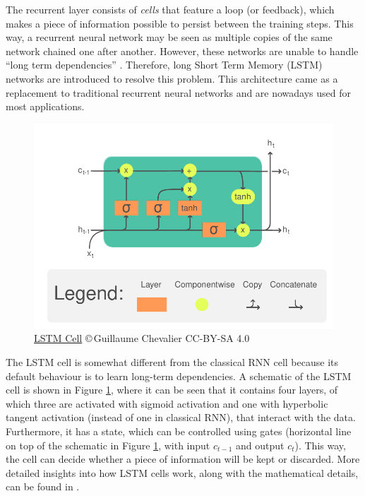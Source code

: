 The recurrent layer consists of \emph{cells} that feature a loop (or feedback), which makes a piece of information possible to persist between the training steps. This way, a recurrent neural network may be seen as multiple copies of the same network chained one after another. However, these networks are unable to handle ``long term dependencies'' \cite{Bengio1994}. Therefore, long Short Term Memory (LSTM) networks are introduced \cite{Hochreiter1997} to resolve this problem. This architecture came as a replacement to traditional recurrent neural networks and are nowadays used for most applications.

\begin{figure}
    \centering
    \includegraphics[width=\textwidth]{slike/LSTM_Cell.pdf}
    \caption[LSTM Cell]{\href{https://commons.wikimedia.org/wiki/File:LSTM_Cell.svg}{LSTM Cell} \copyright\,Guillaume Chevalier CC-BY-SA 4.0}
    \label{fig:LSTMCell}
\end{figure}

The LSTM cell is somewhat different from the classical RNN cell because its default behaviour is to learn long-term dependencies. A schematic of the LSTM cell is shown in Figure \ref{fig:LSTMCell}, where it can be seen that it contains four layers, of which three are activated with sigmoid activation and one with hyperbolic tangent activation (instead of one in classical RNN), that interact with the data. Furthermore, it has a state, which can be controlled using gates (horizontal line on top of the schematic in Figure \ref{fig:LSTMCell}, with input $c_{t-1}$ and output $c_t$). This way, the cell can decide whether a piece of information will be kept or discarded. More detailed insights into how LSTM cells work, along with the mathematical details, can be found in \cite{Olah2015}.

